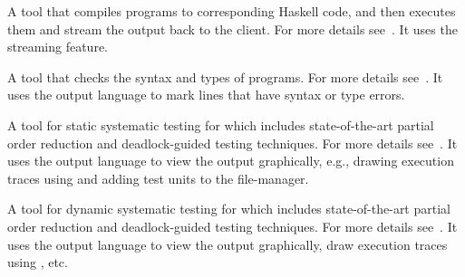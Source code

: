 {%
%
  A tool that compiles \abs programs to corresponding Haskell code,
  and then executes them and stream the output back to the client.
%
}
{%
%
For more details see~\cite{abshcs}.
%
}
{
%
  It uses the streaming feature. 
%
}

{%
%
A tool that checks the syntax and types of \abs programs.
%
}
{%
%
For more details see~\cite{stc}.
%
}
{%
%
  It uses the \ei output language to mark lines that have syntax or
  type errors.
%
}


{%
%
  A tool for static systematic testing for \abs which includes
  state-of-the-art partial order reduction and deadlock-guided testing
  techniques.
%
}
{%
%
For more details see~\cite{apet,AlbertGI16,AlbertGI16a,AlbertAGZR14,AlbertAGM15,WBdBGZdGHMS14}.
%
}
{%
%
  It uses the \ei output language to view the output graphically,
  e.g., drawing execution traces using  and adding test units
  to the file-manager.
%
}

{%
%
  A tool for dynamic systematic testing for \abs which includes
  state-of-the-art partial order reduction and deadlock-guided testing
  techniques.
%
} 
{%
%
For more details see~\cite{syco,AlbertGI16,AlbertGI16a,AlbertAGZR14,AlbertAGM15,WBdBGZdGHMS14}.
%
}
{%
%
  It uses the \ei output language to view the output graphically, draw
  execution traces using , etc.
%
}
